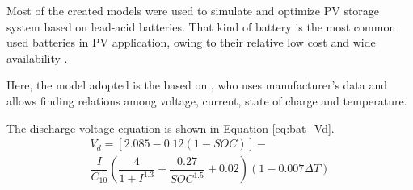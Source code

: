 \documentclass[journal]{IEEEtran}
\begin{document}
%
%
%
%
%
%
%
Most of the created models were used to simulate and optimize PV storage system based on lead-acid batteries. That kind of battery is the most common used batteries in PV application, owing to their relative low cost and wide availability \cite{Copetti}. 

Here, the model adopted is the based on \cite{Copetti}, who uses manufacturer's data and allows finding relations among voltage, current, state of charge and temperature. 

The discharge voltage equation is shown in Equation \ref{eq:bat_Vd}. 
%
\begin{multline}
\label{eq:bat_Vd}
V_{d} = \left[ 2.085-0.12(1-SOC) \right] - \\ \dfrac{I}{C_{10}} \left( \dfrac{4}{1+I^{1.3}} + \dfrac{0.27}{SOC^{1.5}}+0.02 \right) (1-0.007 \Delta T)
\end{multline}
\end{document}
